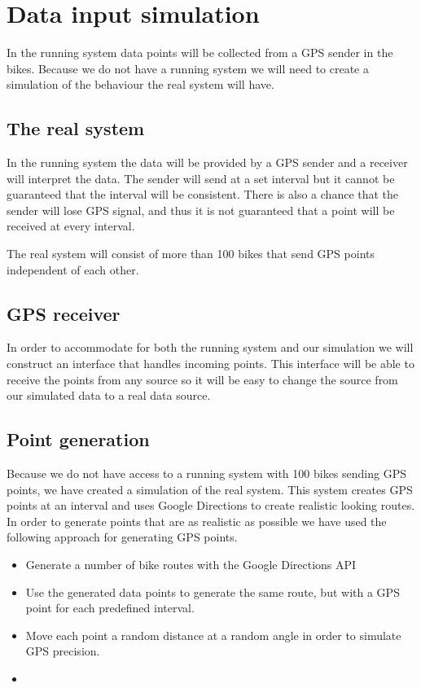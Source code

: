 \section{Data input simulation}

In the running system data points will be collected from a GPS sender in the bikes.
Because we do not have a running system we will need to create a simulation of the behaviour the real system will have.

\subsection{The real system}
In the running system the data will be provided by a GPS sender and a receiver will interpret the data.
The sender will send at a set interval but it cannot be guaranteed that the interval will be consistent. 
There is also a chance that the sender will lose GPS signal, and thus it is not guaranteed that a point will be received at every interval.

The real system will consist of more than 100 bikes that send GPS points independent of each other.

\subsection{GPS receiver}
In order to accommodate for both the running system and our simulation we will construct an interface that handles incoming points.
This interface will be able to receive the points from any source so it will be easy to change the source from our simulated data to a real data source.

\subsection{Point generation}
Because we do not have access to a running system with 100 bikes sending GPS points, we have created a simulation of the real system.
This system creates GPS points at an interval and uses Google Directions to create realistic looking routes.
In order to generate points that are as realistic as possible we have used the following approach for generating GPS points.

\begin{itemize}
\item Generate a number of bike routes with the Google Directions API
\item Use the generated data points to generate the same route, but with a GPS point for each predefined interval.
\item Move each point a random distance at a random angle in order to simulate GPS precision.
\item 
\end{itemize}